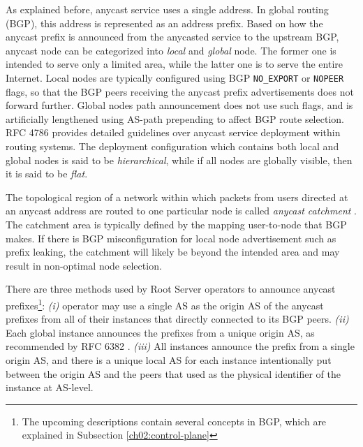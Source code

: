 As explained before, anycast service uses a single address. In global routing (BGP), this address is represented as an address prefix. Based on how the anycast prefix is announced from the anycasted service to the upstream BGP, anycast node can be categorized into \textit{local} and \textit{global} node. The former one is intended to serve only a limited area, while the latter one is to serve the entire Internet. Local nodes are typically configured using BGP \texttt{NO\_EXPORT} or \texttt{NOPEER} flags, so that the BGP peers receiving the anycast prefix advertisements does not forward further. Global nodes path announcement does not use such flags, and is artificially lengthened using AS-path prepending to affect BGP route selection. RFC 4786 \cite{rfc4786} provides detailed guidelines over anycast service deployment within routing systems. The deployment configuration which contains both local and global nodes is said to be \textit{hierarchical}, while if all nodes are globally visible, then it is said to be \textit{flat}.

The topological region of a network within which packets from users directed at an anycast address are routed to one particular node is called \textit{anycast catchment} \cite{rfc4786}. The catchment area is typically defined by the mapping user-to-node that BGP makes. If there is BGP misconfiguration for local node advertisement such as prefix leaking, the catchment will likely be beyond the intended area and may result in non-optimal node selection.

There are three methods used by Root Server operators to announce anycast prefixes\footnote{The upcoming descriptions contain several concepts in BGP, which are explained in Subsection \ref{ch02:control-plane}}: \textit{(i)} operator may use a single AS as the origin AS of the anycast prefixes from all of their instances that directly connected to its BGP peers. \textit{(ii)} Each global instance announces the prefixes from a unique origin AS, as recommended by RFC 6382 \cite{rfc6382}. \textit{(iii)} All instances announce the prefix from a single origin AS, and there is a unique local AS for each instance intentionally put between the origin AS and the peers that used as the physical identifier of the instance at AS-level.

